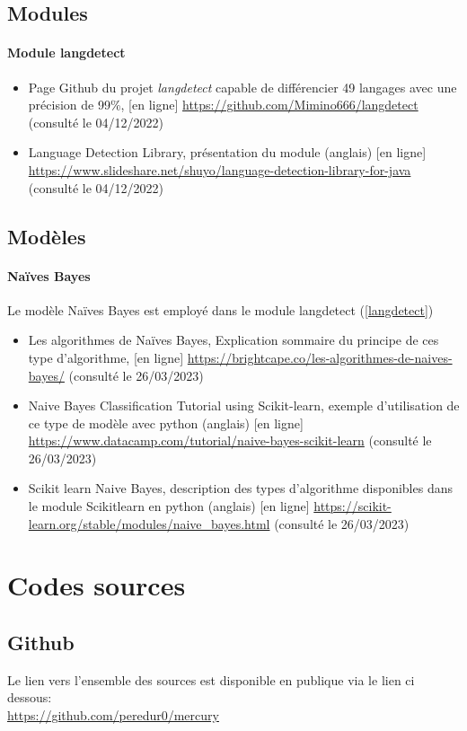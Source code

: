 \documentclass[a4paper,12pt]{article}
\begin{document}
		\subsection{Modules}
			\paragraph{Module langdetect}
			\begin{itemize}
				\item Page Github du projet \emph{langdetect} capable de différencier 49 langages avec une précision de 99\%, [en ligne] \url{https://github.com/Mimino666/langdetect} (consulté le 04/12/2022) \label{langdetect}
				\item Language Detection Library, présentation du module (anglais) [en ligne] \url{https://www.slideshare.net/shuyo/language-detection-library-for-java} (consulté le 04/12/2022)
			\end{itemize}
			
		\subsection{Modèles}
			\paragraph{Naïves Bayes}
				Le modèle Naïves Bayes est employé dans le module langdetect (\ref{langdetect})
			\begin{itemize}
				\item Les algorithmes de Naïves Bayes, Explication sommaire du principe de ces type d'algorithme, [en ligne] \url{https://brightcape.co/les-algorithmes-de-naives-bayes/} (consulté le 26/03/2023)
				\item Naive Bayes Classification Tutorial using Scikit-learn, exemple d'utilisation de ce type de modèle avec python (anglais) [en ligne] \url{https://www.datacamp.com/tutorial/naive-bayes-scikit-learn} (consulté le 26/03/2023)
				\item Scikit learn Naive Bayes, description des types d'algorithme disponibles dans le module Scikitlearn en python (anglais) [en ligne] \url{https://scikit-learn.org/stable/modules/naive_bayes.html} (consulté le 26/03/2023)
			\end{itemize}
			
	\section{Codes sources}
		\subsection{Github}
			Le lien vers l'ensemble des sources est disponible en publique via le lien ci dessous:\\
			\url{https://github.com/peredur0/mercury}
			
\end{document}
